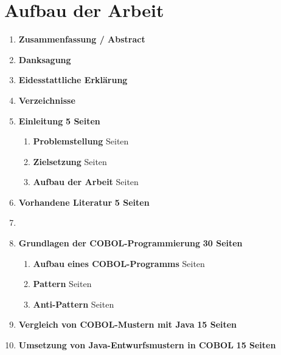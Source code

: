 \section{Aufbau der Arbeit}

\begin{framed}
\begin{enumerate}[label=\arabic*.]
    \item[] \textbf{Zusammenfassung / Abstract}
    \item[] \textbf{Danksagung}
    \item[] \textbf{Eidesstattliche Erklärung}
    \item[] \textbf{Verzeichnisse}
    \item   \textbf{Einleitung}                                         \dotfill \textbf{5 Seiten}
        \begin{enumerate}[label=\arabic*.]
            \item \textbf{Problemstellung}                               Seiten
            \item \textbf{Zielsetzung}                                   Seiten
            \item \textbf{Aufbau der Arbeit}                             Seiten
        \end{enumerate}
    \item   \textbf{Vorhandene Literatur}                               \dotfill \textbf{5 Seiten}
    
    \item[]                                                             \dotfill
    
    \item   \textbf{Grundlagen der COBOL-Programmierung}                \dotfill \textbf{30 Seiten}
        \begin{enumerate}[label=\arabic*.]
          \item \textbf{Aufbau eines COBOL-Programms}                    Seiten
          \item \textbf{Pattern}                                         Seiten
          \item \textbf{Anti-Pattern}                                    Seiten
        \end{enumerate}
    \item   \textbf{Vergleich von COBOL-Mustern mit Java}               \dotfill \textbf{15 Seiten}
    \item   \textbf{Umsetzung von Java-Entwurfsmustern in COBOL}        \dotfill \textbf{15 Seiten}
    

\end{enumerate}
\end{framed}
